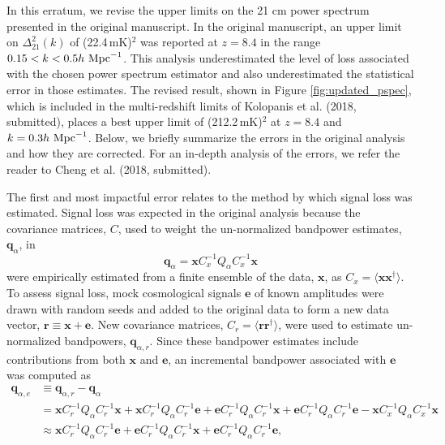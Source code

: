 \documentclass[onecolumn]{emulateapj} \shorttitle{}
\newcommand{\hMpci}{h\ {\rm Mpc}^{-1}}
\newcommand{\mKlimit}{(22.4\,\textrm{mK})$^2$ }
\newcommand{\revisedmklimit}{(212.2\,\textrm{mK})$^2$}
\newcommand{\kolopaniscitet}{Kolopanis et al. (2018, submitted)}
\newcommand{\chengcitet}{Cheng et al. (2018, submitted)}
\begin{document}
\maketitle

In this erratum, we revise the upper limits on the 21 cm power spectrum presented
in the original manuscript.  In the original manuscript, an upper limit on 
$\Delta_{21}^2(k)$ of \mKlimit was reported at $z=8.4$ in the range $0.15<k<0.5\hMpci$.
This analysis underestimated 
the level of loss associated with the chosen power spectrum estimator and also underestimated 
the statistical error in those estimates.  The revised result, shown in Figure \ref{fig:updated_pspec}, 
which is included in
the multi-redshift limits of \kolopaniscitet, places a best upper limit of \revisedmklimit 
at $z=8.4$ and $k=0.3\hMpci$.
Below, we briefly summarize the errors in the original analysis and how they are corrected.
For an in-depth analysis of the errors, we refer the reader to \chengcitet.

The first and most impactful error relates to the method by which signal loss was estimated.
Signal loss was expected in the original analysis because the covariance matrices, $C$,
used to weight the un-normalized bandpower estimates, ${\mathbf q}_\alpha$, in
\begin{equation}
{\mathbf q}_\alpha = {\mathbf x}C_{x}^{-1}Q_\alpha C_{x}^{-1}{\mathbf x}
\end{equation} 
were empirically estimated from a finite ensemble of the data, $\mathbf x$, as $C_{x}=\langle {\mathbf x} {\mathbf x}^\dagger\rangle$.
To assess signal loss, mock cosmological signals $\mathbf e$ of known amplitudes were 
drawn with random seeds and added to the original data to form a new data vector, ${\mathbf r}\equiv{\mathbf x} + {\mathbf e}$.
New covariance matrices, $C_r=\langle{\mathbf r}\mathbf{r}^\dagger\rangle$, were used to estimate un-normalized bandpowers, 
${\mathbf q}_{\alpha,r}$. Since these bandpower estimates include contributions from both $\mathbf x$ and $\mathbf e$,
an incremental bandpower associated with $\mathbf e$ was computed as
\begin{align}
{\mathbf q}_{\alpha,e}&\equiv{\mathbf q}_{\alpha,r}-{\mathbf q}_\alpha \\
&=
{\mathbf x}C_r^{-1}Q_\alpha C_r^{-1}{\mathbf x}+
{\mathbf x}C_r^{-1}Q_\alpha C_r^{-1}{\mathbf e}+
{\mathbf e}C_r^{-1}Q_\alpha C_r^{-1}{\mathbf x}+
{\mathbf e}C_r^{-1}Q_\alpha C_r^{-1}{\mathbf e}
- {\mathbf x}C_x^{-1}Q_\alpha C_x^{-1}{\mathbf x} \\
&\approx
{\mathbf x}C_r^{-1}Q_\alpha C_r^{-1}{\mathbf e}+
{\mathbf e}C_r^{-1}Q_\alpha C_r^{-1}{\mathbf x}+
{\mathbf e}C_r^{-1}Q_\alpha C_r^{-1}{\mathbf e},
\label{eq:crossterms}
\end{align}
\end{document}
